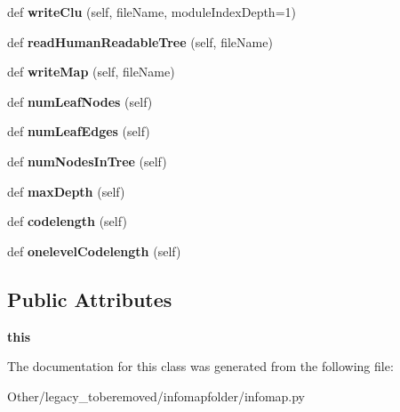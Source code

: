 \begin{DoxyCompactItemize}
def {\bfseries write\+Clu} (self, file\+Name, module\+Index\+Depth=1)
\item 
\mbox{\label{classinfomapfolder_1_1infomap_1_1HierarchicalNetwork_a7717edfb030cee6c376c1fa1e84c39f8}} 
def {\bfseries read\+Human\+Readable\+Tree} (self, file\+Name)
\item 
\mbox{\label{classinfomapfolder_1_1infomap_1_1HierarchicalNetwork_a713e5a5b712650d87c6f4b0f59f7fa20}} 
def {\bfseries write\+Map} (self, file\+Name)
\item 
\mbox{\label{classinfomapfolder_1_1infomap_1_1HierarchicalNetwork_a66ac478f2eeb58cb4aa653b28576a89b}} 
def {\bfseries num\+Leaf\+Nodes} (self)
\item 
\mbox{\label{classinfomapfolder_1_1infomap_1_1HierarchicalNetwork_ab78c97ef076babb8ddc4a55a9826b4ad}} 
def {\bfseries num\+Leaf\+Edges} (self)
\item 
\mbox{\label{classinfomapfolder_1_1infomap_1_1HierarchicalNetwork_a7529adca8fc6a8236982f923956a39c9}} 
def {\bfseries num\+Nodes\+In\+Tree} (self)
\item 
\mbox{\label{classinfomapfolder_1_1infomap_1_1HierarchicalNetwork_a2f94d606b4537b3e8f7700f8fedf29ca}} 
def {\bfseries max\+Depth} (self)
\item 
\mbox{\label{classinfomapfolder_1_1infomap_1_1HierarchicalNetwork_af0089035eb28d831b187daa804a19232}} 
def {\bfseries codelength} (self)
\item 
\mbox{\label{classinfomapfolder_1_1infomap_1_1HierarchicalNetwork_aaf211de08fa57efb20292cc5417bae1b}} 
def {\bfseries onelevel\+Codelength} (self)
\end{DoxyCompactItemize}
\subsection*{Public Attributes}
\begin{DoxyCompactItemize}
\item 
\mbox{\label{classinfomapfolder_1_1infomap_1_1HierarchicalNetwork_a61e5bae068aed13bcdb6a3fbfc659892}} 
{\bfseries this}
\end{DoxyCompactItemize}


The documentation for this class was generated from the following file\+:\begin{DoxyCompactItemize}
\item 
Other/legacy\+\_\+toberemoved/infomapfolder/infomap.\+py\end{DoxyCompactItemize}
